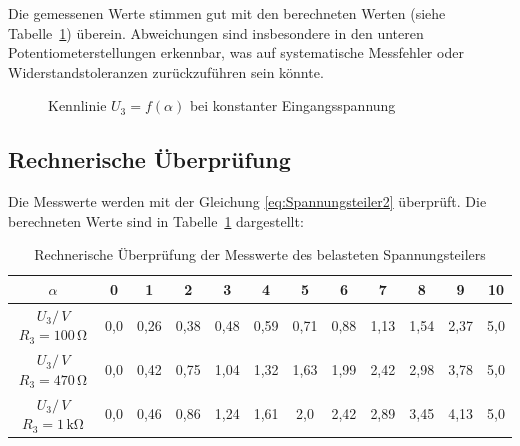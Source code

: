 Die gemessenen Werte stimmen gut mit den berechneten Werten (siehe Tabelle~\ref{tab:K5T2}) überein. Abweichungen sind insbesondere in den unteren Potentiometerstellungen erkennbar, was auf systematische Messfehler oder Widerstandstoleranzen zurückzuführen sein könnte.

\begin{figure}[H]
\centering
{}
\caption{Kennlinie $U_3 = f(\alpha)$ bei konstanter Eingangsspannung}
\label{fig:K5A3}
\end{figure}

\subsection{Rechnerische Überprüfung}
Die Messwerte werden mit der Gleichung \eqref{eq:Spannungsteiler2} überprüft. Die berechneten Werte sind in Tabelle~\ref{tab:K5T2} dargestellt:

\begin{table}[H]
\centering
\begin{footnotesize}
\caption{Rechnerische Überprüfung der Messwerte des belasteten Spannungsteilers}
\begin{tabular}{c c c c c c c c c c c c }
\toprule
$\alpha$ & 0 & 1 & 2 & 3 & 4 & 5 & 6 & 7 & 8 & 9 & 10 \\
\midrule
$U_3/\,\unit{V}$ $R_3=100\,\unit{\ohm}$ & 0,0 & 0,26 & 0,38 & 0,48 & 0,59 & 0,71 & 0,88 & 1,13 & 1,54 & 2,37 & 5,0 \\
$U_3/\,\unit{V}$ $R_3=470\,\unit{\ohm}$ & 0,0 & 0,42 & 0,75 & 1,04 & 1,32 & 1,63 & 1,99 & 2,42 & 2,98 & 3,78 & 5,0 \\
$U_3/\,\unit{V}$ $R_3=1\,\unit{\kohm}$ & 0,0 & 0,46 & 0,86 & 1,24 & 1,61 & 2,0 & 2,42 & 2,89 & 3,45 & 4,13 & 5,0 \\
\bottomrule
\end{tabular}
\label{tab:K5T2}
\end{footnotesize}
\end{table}

